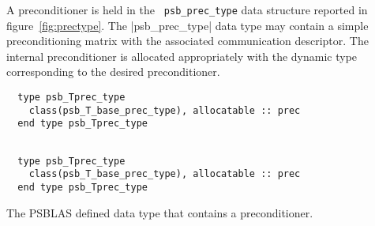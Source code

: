  A preconditioner is held in the \hypertarget{precdata}{{\tt
    psb\_prec\_type}} data structure reported in 
figure~\ref{fig:prectype}. The \fortinline|psb_prec_type| 
data type may contain a simple preconditioning matrix with the
associated communication descriptor.%
The internal preconditioner is allocated appropriately with the
dynamic type corresponding to the desired preconditioner. 
\begin{listing}[h!]
\ifpdf
\begin{verbatim}
  type psb_Tprec_type
    class(psb_T_base_prec_type), allocatable :: prec
  end type psb_Tprec_type
\end{verbatim}
\else
  \small
\begin{center}
    \begin{minipage}[tl]{0.9\textwidth}
\begin{verbatim}

  type psb_Tprec_type
    class(psb_T_base_prec_type), allocatable :: prec
  end type psb_Tprec_type

\end{verbatim}
    \end{minipage}
  \end{center}
\fi
  \caption{\label{fig:prectype}The PSBLAS defined data type that contains a preconditioner.}
\end{listing}

